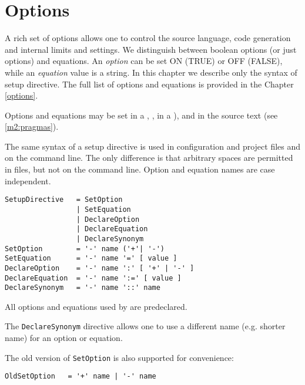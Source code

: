\section{Options}\label{config:options}

A rich set of \xc{} options allows one to control the source language,
code generation and internal limits and settings.  We distinguish
between boolean options (or just options) and equations. An {\em option} can
be set ON (TRUE) or OFF (FALSE), while an {\em equation} value is a string.
In this chapter we describe only the syntax of setup
directive. The full list of \xc{} options and equations is provided in
the Chapter \ref{options}.

Options and equations may be set in a ,
, in a ),
and in the source text (see \ref{m2:pragmas}).

The same syntax of a setup directive is used in configuration
and project files and on the command line. The only difference is
that arbitrary spaces are permitted in files, but not on the
command line. Option and equation names are case independent.

\begin{verbatim}
SetupDirective   = SetOption
                 | SetEquation
                 | DeclareOption
                 | DeclareEquation
                 | DeclareSynonym
SetOption        = '-' name ('+'| '-')
SetEquation      = '-' name '=' [ value ]
DeclareOption    = '-' name ':' [ '+' | '-' ]
DeclareEquation  = '-' name ':=' [ value ]
DeclareSynonym   = '-' name '::' name
\end{verbatim}
All options and equations used by \xc{} are predeclared.

The \verb|DeclareSynonym| directive allows one to use a different name
(e.g. shorter name) for an option or equation.

The old version of {\tt SetOption} is also supported for convenience:

\verb"OldSetOption   = '+' name | '-' name"

